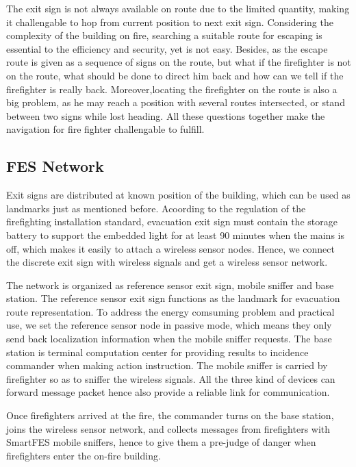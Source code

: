 \documentclass[conference]{IEEEtran}
\begin{document}
    The exit sign is not always available on route due to the limited quantity, making it challengable to hop from current position to next exit sign. Considering the complexity of the building on fire, searching a suitable route for escaping is essential to the efficiency and security, yet is not easy. Besides, as the escape route is given as a sequence of signs on the route, but what if the firefighter is not on the route, what should be done to direct him back and how can we tell if the firefighter is really back. Moreover,locating the firefighter on the route is also a big problem, as he may reach a position with several routes intersected, or stand between two signs while lost heading. All these questions together make the navigation for fire fighter challengable to fulfill.

    \subsection{FES Network}
    
    Exit signs are distributed at known position of the building, which can be used as landmarks just as mentioned before. Acoording to the regulation of the firefighting installation standard, evacuation exit sign must contain the storage battery to support the embedded light for at least 90 minutes when the mains is off, which makes it easily to attach a wireless sensor nodes. Hence, we connect the discrete exit sign with wireless signals and get a wireless sensor network.

    The network is organized as reference sensor exit sign, mobile sniffer and base station. The reference sensor exit sign functions as the landmark for evacuation route representation. To address the energy comsuming problem and practical use, we set the reference sensor node in passive mode, which means they only send back localization information when the mobile sniffer requests. The base station is terminal computation center for providing results to incidence commander when making action instruction. The mobile sniffer is carried by firefighter so as to sniffer the wireless signals. All the three kind of devices can forward message packet hence also provide a reliable link for communication.

    Once firefighters arrived at the fire, the commander turns on the base station, joins the wireless sensor network, and collects messages from firefighters with SmartFES mobile sniffers, hence to give them a pre-judge of danger when firefighters enter the on-fire building.
\end{document}
